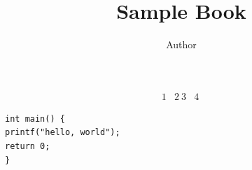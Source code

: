 \documentclass[11pt]{book}
\title{Sample Book}
\author{Author}
\begin{document}
\frontmatter
\maketitle

\tableofcontents

%

%

%

%

%

\begin{align}
1 & 2 \
3 & 4\
\end{align}



\begin{verbatim}
int main() {
printf("hello, world");
return 0;
}
\end{verbatim}




%
%


\end{document}
